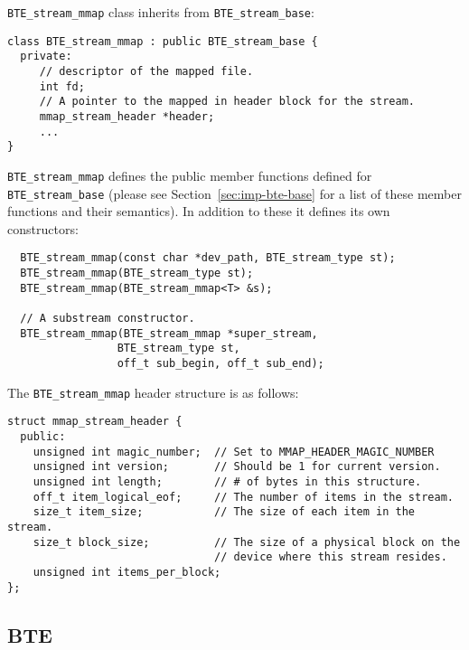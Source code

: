 \lstinline|BTE_stream_mmap| class inherits from \lstinline|BTE_stream_base|:
\begin{lstlisting}
class BTE_stream_mmap : public BTE_stream_base {
  private:
     // descriptor of the mapped file.  
     int fd;   
     // A pointer to the mapped in header block for the stream. 
     mmap_stream_header *header;
     ...
}  
\end{lstlisting}

\lstinline|BTE_stream_mmap| defines the public member
functions defined for \lstinline|BTE_stream_base| (please see
Section~\ref{sec:imp-bte-base} for a list of these member
functions and their semantics).  In addition to these it
defines its own constructors: 
\begin{lstlisting}
  BTE_stream_mmap(const char *dev_path, BTE_stream_type st);
  BTE_stream_mmap(BTE_stream_type st); 
  BTE_stream_mmap(BTE_stream_mmap<T> &s); 
  
  // A substream constructor.
  BTE_stream_mmap(BTE_stream_mmap *super_stream,
                 BTE_stream_type st,
                 off_t sub_begin, off_t sub_end);
\end{lstlisting}

The \lstinline|BTE_stream_mmap| header
structure is as follows:

\begin{lstlisting}
struct mmap_stream_header { 
  public:
    unsigned int magic_number;  // Set to MMAP_HEADER_MAGIC_NUMBER
    unsigned int version;       // Should be 1 for current version.
    unsigned int length;        // # of bytes in this structure.
    off_t item_logical_eof;     // The number of items in the stream.
    size_t item_size;           // The size of each item in the stream.
    size_t block_size;          // The size of a physical block on the
                                // device where this stream resides.
    unsigned int items_per_block;
};
\end{lstlisting}




\subsection{BTE }

